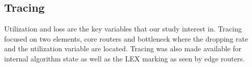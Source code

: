 \subsection{Tracing}

Utilization and loss are the key variables that our study interest in. Tracing focused on two elements, core routers and bottleneck where the dropping rate and the utilization variable are located. Tracing was also made available for internal algorithm state as well as the LEX marking as seen by edge routers.

